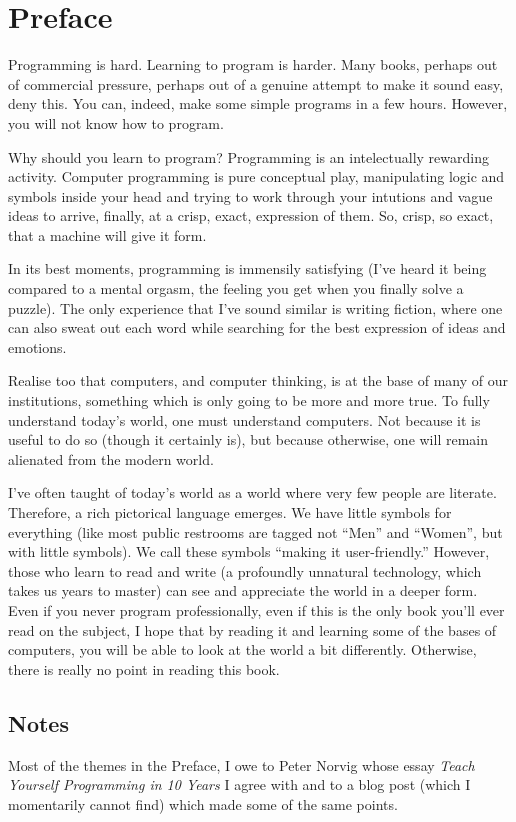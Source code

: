 \chapter*{Preface}

Programming is hard. Learning to program is harder. Many books, perhaps out of
commercial pressure, perhaps out of a genuine attempt to make it sound easy,
deny this. You can, indeed, make some simple programs in a few hours. However,
you will not know how to program.

Why should you learn to program? Programming is an intelectually rewarding
activity. Computer programming is pure conceptual play, manipulating logic and
symbols inside your head and trying to work through your intutions and vague
ideas to arrive, finally, at a crisp, exact, expression of them. So, crisp, so
exact, that a machine will give it form.

In its best moments, programming is immensily satisfying (I've heard it being
compared to a mental orgasm, the feeling you get when you finally solve a
puzzle). The only experience that I've sound similar is writing fiction, where
one can also sweat out each word while searching for the best expression of
ideas and emotions.

Realise too that computers, and computer thinking, is at the base of many of
our institutions, something which is only going to be more and more true. To
fully understand today's world, one must understand computers. Not because it
is useful to do so (though it certainly is), but because otherwise, one will
remain alienated from the modern world.

I've often taught of today's world as a world where very few people are
literate. Therefore, a rich pictorical language emerges. We have little symbols
for everything (like most public restrooms are tagged not ``Men'' and
``Women'', but with little symbols). We call these symbols ``making it
user-friendly.'' However, those who learn to read and write (a profoundly
unnatural technology, which takes us years to master) can see and appreciate
the world in a deeper form. Even if you never program professionally, even if
this is the only book you'll ever read on the subject, I hope that by reading
it and learning some of the bases of computers, you will be able to look at the
world a bit differently. Otherwise, there is really no point in reading this
book.

\section*{Notes}

Most of the themes in the Preface, I owe to Peter Norvig whose essay
\emph{Teach Yourself Programming in 10 Years} I agree with and to a blog post
(which I momentarily cannot find) which made some of the same points.

